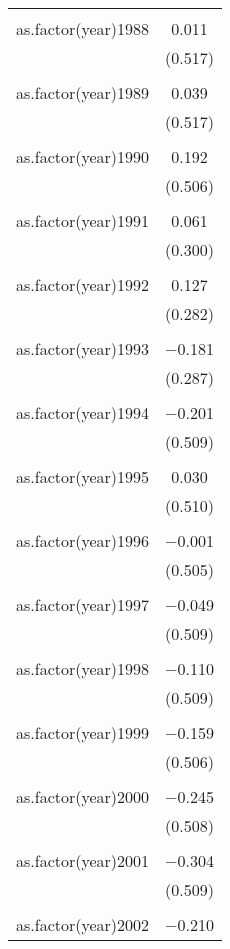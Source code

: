 \documentclass[12pt,letterpaper]{article}
\begin{document}
\begin{table}[!htbp]
{\begin{tabular}{@{\extracolsep{5pt}}lc}
		& \\ 
		as.factor(year)1988 & 0.011 \\ 
		& (0.517) \\ 
		& \\ 
		as.factor(year)1989 & 0.039 \\ 
		& (0.517) \\ 
		& \\ 
		as.factor(year)1990 & 0.192 \\ 
		& (0.506) \\ 
		& \\ 
		as.factor(year)1991 & 0.061 \\ 
		& (0.300) \\ 
		& \\ 
		as.factor(year)1992 & 0.127 \\ 
		& (0.282) \\ 
		& \\ 
		as.factor(year)1993 & $-$0.181 \\ 
		& (0.287) \\ 
		& \\ 
		as.factor(year)1994 & $-$0.201 \\ 
		& (0.509) \\ 
		& \\ 
		as.factor(year)1995 & 0.030 \\ 
		& (0.510) \\ 
		& \\ 
		as.factor(year)1996 & $-$0.001 \\ 
		& (0.505) \\ 
		& \\ 
		as.factor(year)1997 & $-$0.049 \\ 
		& (0.509) \\ 
		& \\ 
		as.factor(year)1998 & $-$0.110 \\ 
		& (0.509) \\ 
		& \\ 
		as.factor(year)1999 & $-$0.159 \\ 
		& (0.506) \\ 
		& \\ 
		as.factor(year)2000 & $-$0.245 \\ 
		& (0.508) \\ 
		& \\ 
		as.factor(year)2001 & $-$0.304 \\ 
		& (0.509) \\ 
		& \\ 
		as.factor(year)2002 & $-$0.210 \\ 

\end{tabular}}
\end{table}
\end{document}
